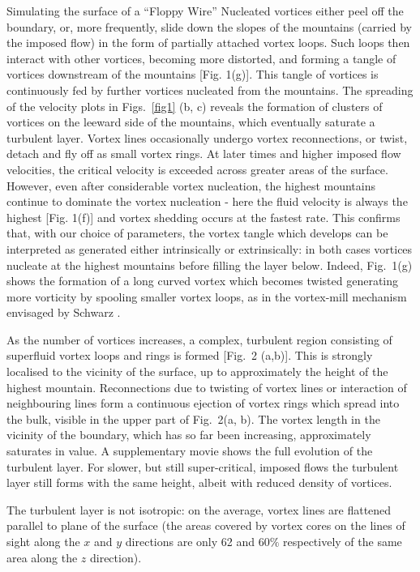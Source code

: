 \begin{chapter}{\label{cha:afm}Simulating the surface of a ``Floppy Wire''}
Nucleated vortices either peel off the boundary, or, more frequently, slide
down the slopes of the mountains (carried by the imposed flow) in the form of partially attached vortex loops.
Such loops then interact with other vortices, becoming more distorted, and forming a tangle of vortices downstream of the mountains [Fig. 1(g)].  This tangle of vortices is continuously fed by further vortices nucleated from the mountains.  The spreading of the velocity plots in Figs.~\ref{fig1} (b, c) reveals
the formation of clusters of vortices on the leeward side of the mountains, which eventually saturate a
turbulent layer.  Vortex lines occasionally undergo vortex reconnections, or twist, detach and fly off as small 
vortex rings. At later times and higher imposed flow velocities, the critical velocity is exceeded across greater areas of the surface.  However, even after considerable vortex nucleation, the highest mountains continue to dominate the vortex nucleation - here the fluid velocity is always the highest [Fig. 1(f)] and vortex shedding occurs at the fastest rate. This confirms that, with our choice of parameters,
the vortex tangle which develops can be interpreted as generated either
intrinsically or extrinsically: in both cases vortices nucleate 
at the highest mountains before filling the layer below.
Indeed, Fig.~1(g) shows the formation of a long curved
vortex which becomes twisted generating more vorticity  by spooling smaller vortex loops, 
as in the vortex-mill mechanism envisaged by Schwarz \cite{Schwarz-mill}.

As the number of vortices increases, a complex,
turbulent region consisting of superfluid vortex loops and rings is 
formed [Fig.~2 (a,b)].  This is strongly localised to the vicinity of the surface, up to approximately the height of the highest mountain. Reconnections due to twisting of vortex lines or interaction of neighbouring lines form a continuous ejection of vortex rings which spread into the bulk, visible in
the upper part of Fig.~2(a, b). The vortex length in the vicinity of the boundary, which has so far been increasing, approximately saturates in value. {A supplementary movie \cite{supp} shows the full evolution of the turbulent layer.}   For slower, but still super-critical, imposed flows the turbulent layer still forms with the same height, albeit with reduced density of vortices.

The turbulent
layer is not isotropic: on the average, vortex lines are 
flattened parallel to plane of the surface
(the areas covered by vortex cores on
the lines of sight along the $x$ and $y$ directions are only 62 and 60$\%$ 
respectively of the same area along the $z$ direction).  


\end{chapter}
